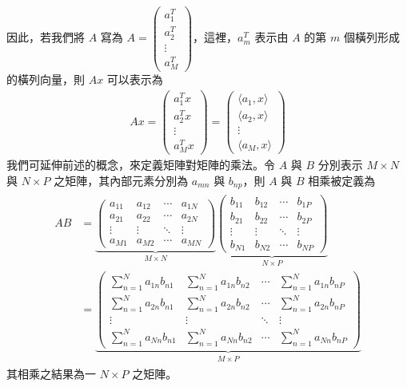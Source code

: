 \documentclass[letterpaper,10pt,english]{sphinxmanual}
\begin{document}
因此，若我們將 \(A\) 寫為 \(A =
\begin{pmatrix}
  a_1^T \\
  a_2^T  \\
  \vdots \\
  a_{M}^T
 \end{pmatrix}\)，這裡，\(a_m^T\) 表示由 \(A\) 的第 \(m\) 個橫列形成的橫列向量，則 \(Ax\) 可以表示為
\begin{equation*}
\begin{split}
 Ax
 = \begin{pmatrix}
   a_1^Tx  \\
   a_2^Tx  \\
  \vdots \\
   a_M^Tx
 \end{pmatrix}
 = \begin{pmatrix}
  \langle a_1,x \rangle \\
  \langle a_2,x \rangle \\
  \vdots \\
  \langle a_M,x \rangle
 \end{pmatrix}
 \end{split}
\end{equation*}
我們可延伸前述的概念，來定義矩陣對矩陣的乘法。令 \(A\) 與 \(B\) 分別表示 \(M \times N\) 與 \(N \times P\) 之矩陣，其內部元素分別為 \(a_{mn}\) 與 \(b_{np}\)，則 \(A\) 與 \(B\) 相乘被定義為
\begin{equation*}
\begin{split}
\begin{aligned}
AB &=
 \underbrace{\begin{pmatrix}
  a_{11} & a_{12} & \cdots & a_{1N} \\
  a_{21} & a_{22} & \cdots & a_{2N} \\
  \vdots  & \vdots  & \ddots & \vdots  \\
  a_{M1} & a_{M2} & \cdots & a_{MN}
 \end{pmatrix}}_{M \times N}
  \underbrace{\begin{pmatrix}
  b_{11} & b_{12} & \cdots & b_{1P} \\
  b_{21} & b_{22} & \cdots & b_{2P} \\
  \vdots  & \vdots  & \ddots & \vdots  \\
  b_{N1} & b_{N2} & \cdots & b_{NP}
 \end{pmatrix}}_{N \times P} \\
  &=
  \underbrace{\begin{pmatrix}
  \sum_{n=1}^N a_{1n} b_{n1} & \sum_{n=1}^N a_{1n} b_{n2} & \cdots & \sum_{n=1}^N a_{1n} b_{nP} \\
  \sum_{n=1}^N a_{2n} b_{n1} & \sum_{n=1}^N a_{2n} b_{n2} & \cdots & \sum_{n=1}^N a_{2n} b_{nP} \\
  \vdots  & \vdots  & \ddots & \vdots  \\
  \sum_{n=1}^N a_{Nn} b_{n1} & \sum_{n=1}^N a_{Nn} b_{n2} & \cdots & \sum_{n=1}^N a_{Nn} b_{nP}
 \end{pmatrix}}_{M \times P}
 \end{aligned}
\end{split}
\end{equation*}
其相乘之結果為一 \(N \times P\) 之矩陣。
\end{document}
